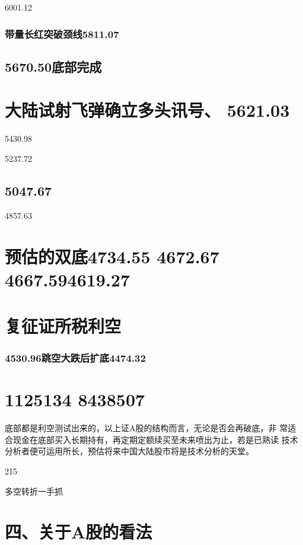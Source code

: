 \documentclass{article}
\begin{document}
6001.12

\subsubsection{带量长红突破颈线5811.07}

\subsection{5670.50底部完成}

\section{大陆试射飞弹确立多头讯号、 5621.03}

5430.98

5237.72

\subsection{5047.67}

4857.63

\section{预估的双底4734.55 4672.67 4667.594619.27}

\section{复征证所税利空}

\subsubsection{4530.96跳空大跌后扩底4474.32}

\section{1125134 8438507}

底部都是利空测试出来的，以上证A股的结构而言，无论是否会再破底，非 常适合现金在底部买入长期持有，再定期定额续买至未来喷出为止，若是已熟读 技术分析者便可运用所长，预估将来中国大陆股市将是技术分析的天堂。

215

\clearpage

多空转折一手抓

\section{四、关于A股的看法}
\end{document}

